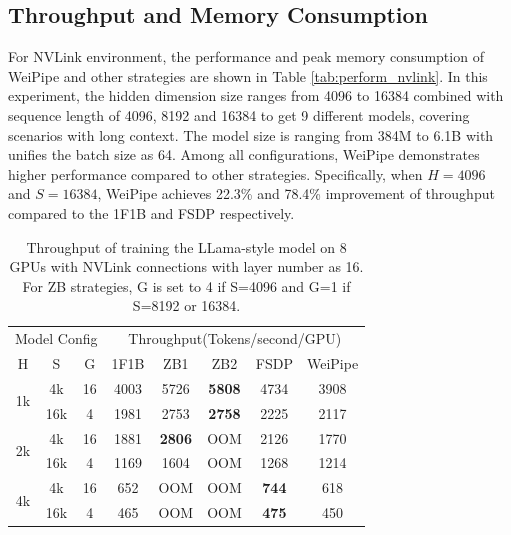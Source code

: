 \documentclass[sigplan,review]{acmart}
\begin{document}
\subsection{Throughput and Memory Consumption}

For NVLink environment, the performance and peak memory consumption of WeiPipe and other strategies are shown in Table \ref{tab:perform_nvlink}. In this experiment, the hidden dimension size ranges from 4096 to 16384 combined with sequence length of 4096, 8192 and 16384 to get 9 different models, covering scenarios with long context. The model size is ranging from 384M to 6.1B with unifies the batch size as 64. Among all configurations, WeiPipe demonstrates higher performance compared to other strategies. Specifically, when $H=4096$ and $S=16384$, WeiPipe achieves 22.3\% and 78.4\% improvement of throughput compared to the 1F1B and FSDP respectively. 


\begin{table}[!ht]
\centering
\caption{Throughput of training the LLama-style model on 8 GPUs with NVLink connections with layer number as 16. For ZB strategies, G is set to 4 if S=4096 and G=1 if S=8192 or 16384.}
\begin{tabular}{ccc|ccccc}
\hline
\multicolumn{3}{c|}{Model Config} & \multicolumn{5}{c}{Throughput(Tokens/second/GPU)}              \\
H                    & S    & G   & 1F1B & ZB1           & ZB2           & FSDP         & WeiPipe \\ \hline
\multirow{2}{*}{1k}  & 4k   & 16  & 4003 & 5726          & \textbf{5808} & 4734         & 3908    \\
                     & 16k  & 4   & 1981 & 2753          & \textbf{2758} & 2225         & 2117    \\ \hline
\multirow{2}{*}{2k}  & 4k   & 16  & 1881 & \textbf{2806} & OOM           & 2126         & 1770    \\
                     & 16k  & 4   & 1169 & 1604          & OOM & 1268         & 1214    \\ \hline
\multirow{2}{*}{4k}  & 4k   & 16  & 652  & OOM           & OOM           & \textbf{744} & 618     \\
                     & 16k  & 4   & 465  & OOM           & OOM           & \textbf{475} & 450     \\ \hline
\end{tabular}
\label{tab:only_nvlink}
\end{table}
\end{document}
